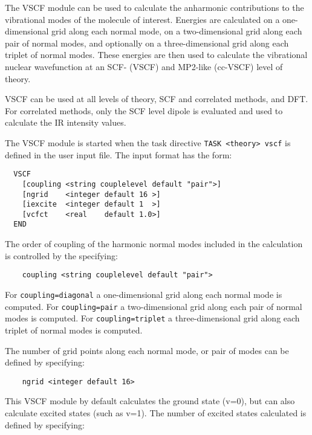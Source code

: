 %
%
\label{sec:vscf}

The VSCF module can be used to calculate the anharmonic contributions to the 
vibrational modes of the molecule of interest. Energies are calculated on a 
one-dimensional grid along each normal mode, on a two-dimensional grid along
each pair of normal modes, and optionally on a three-dimensional grid along
each triplet of normal modes. These energies are then used to calculate the
vibrational nuclear wavefunction at an SCF- (VSCF) and MP2-like (cc-VSCF) level
of theory. 

VSCF can be used at all levels of theory, SCF and correlated methods, and DFT.  
For correlated methods, only the SCF level dipole is evaluated and used to 
calculate the IR intensity values. 

The VSCF module is started when the task directive
\verb+TASK <theory> vscf+ is defined in the user input file. The input 
format has the form:

\begin{verbatim}
  VSCF
    [coupling <string couplelevel default "pair">]
    [ngrid    <integer default 16 >]
    [iexcite  <integer default 1  >]
    [vcfct    <real    default 1.0>]
  END
\end{verbatim}

The order of coupling of the harmonic normal modes included in the calculation
is controlled by the specifying:

\begin{verbatim}
    coupling <string couplelevel default "pair">
\end{verbatim}

For \verb+coupling=diagonal+ a one-dimensional grid along each normal mode is computed.
For \verb+coupling=pair+ a two-dimensional grid along each pair of normal modes is computed.
For \verb+coupling=triplet+ a three-dimensional grid along each triplet of normal modes is computed.

The number of grid points along each normal mode, or pair of modes can be defined 
by specifying:

\begin{verbatim}
    ngrid <integer default 16>
\end{verbatim}

This VSCF module by default calculates the ground state (v=0), but can also calculate excited
states (such as v=1). The number of excited states calculated is defined by specifying:

